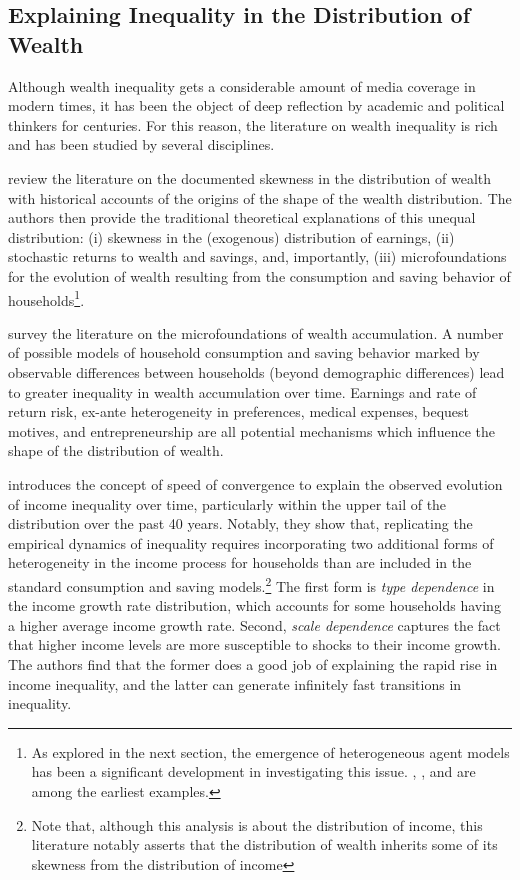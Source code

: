 \subsection{Explaining Inequality in the Distribution of Wealth}

\par Although wealth inequality gets a considerable amount of media coverage in modern times, it has been the object of deep reflection by academic and political thinkers for centuries. For this reason, the literature on wealth inequality is rich and has been studied by several disciplines. 

\par \cite{jbab18} review the literature on the documented skewness in the distribution of wealth with historical accounts of the origins of the shape of the wealth distribution. The authors then provide the traditional theoretical explanations of this unequal distribution: (i) skewness in the (exogenous) distribution of earnings, (ii) stochastic returns to wealth and savings, and, importantly, (iii) microfoundations for the evolution of wealth resulting from the consumption and saving behavior of households\footnote{As explored in the next section, the emergence of heterogeneous agent models has been a significant development in investigating this issue. \cite{tb1983}, \cite{ra1994}, and \cite{mh1993} are among the earliest examples.}.
 
\par \cite{De_Nardi2017} survey the literature on the microfoundations of wealth accumulation. A number of possible models of household consumption and saving behavior marked by observable differences between households (beyond demographic differences) lead to greater inequality in wealth accumulation over time. Earnings and rate of return risk, ex-ante heterogeneity in preferences, medical expenses, bequest motives, and entrepreneurship are all potential mechanisms which influence the shape of the distribution of wealth.

\par \cite{Gabaix2016} introduces the concept of speed of convergence to explain the observed evolution of income inequality over time, particularly within the upper tail of the distribution over the past 40 years. Notably, they show that, replicating the empirical dynamics of inequality requires incorporating two additional forms of heterogeneity in the income process for households than are included in the standard consumption and saving models.\footnote{Note that, although this analysis is about the distribution of income, this literature notably asserts that the distribution of wealth inherits some of its skewness from the distribution of income} The first form is \textit{type dependence} in the income growth rate distribution, which accounts for some households having a higher average income growth rate. Second, \textit{scale dependence} captures the fact that higher income levels are more susceptible to shocks to their income growth. The authors find that the former does a good job of explaining the rapid rise in income inequality, and the latter can generate infinitely fast transitions in inequality.

